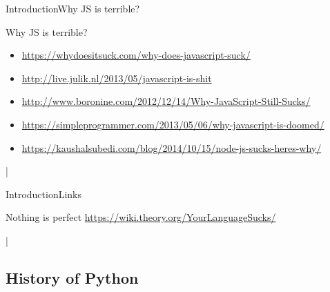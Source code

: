 \documentclass[10pt]{beamer}
\begin{document}
\begin{frame}{Introduction}{Why JS is terrible?}
\begin{center}
	\begin{block}{Why JS is terrible?}
		\begin{itemize}
			\item \url{https://whydoesitsuck.com/why-does-javascript-suck/}
			\pause 
			
			\item \url{http://live.julik.nl/2013/05/javascript-is-shit}
			\pause 
			
			\item \url{http://www.boronine.com/2012/12/14/Why-JavaScript-Still-Sucks/}
			\pause
			
			\item \url{https://simpleprogrammer.com/2013/05/06/why-javascript-is-doomed/}
			\pause
			
			\item \url{https://kaushalsubedi.com/blog/2014/10/15/node-js-sucks-heres-why/}
			
		\end{itemize}
	\end{block}
\end{center}|

\end{frame}


\begin{frame}{Introduction}{Links}
\begin{center}
	\Large{Nothing is perfect} 
	\url{https://wiki.theory.org/YourLanguageSucks/}
\end{center}|
\end{frame}

\subsection{History of Python}
\end{document}

